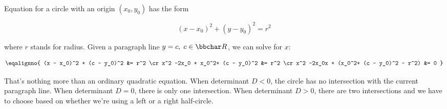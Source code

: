 Equation for a circle with an origin $(x_0, y_0)$ has the form

$$
(x - x_0)^2 + (y - y_0)^2 = r^2
$$

where $r$ stands for radius. Given a paragraph line $y = c,\;c\in{\bbchar R}$, we can solve
for $x$:

$$
\eqalignno{
(x - x_0)^2 + (c - y_0)^2 &= r^2 \cr
x^2 -2x_0 + x_0^2+ (c - y_0)^2 &= r^2 \cr
x^2 -2x_0x + (x_0^2+ (c - y_0)^2 - r^2) &= 0
}
$$

That's nothing more than an ordinary quadratic equation. When determinant $D < 0$,
the circle has no intersection with the current paragraph line. When determinant $D = 0$,
there is only one intersection. When determinant $D > 0$, there are two intersections
and we have to choose based on whether we're using a left or a right half-circle.

\bye
